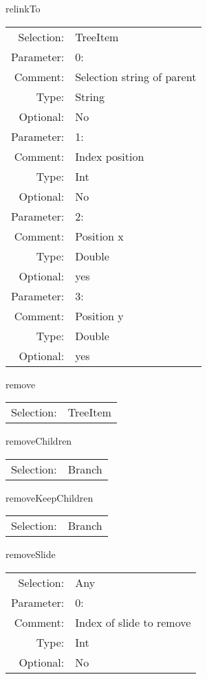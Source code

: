 \item relinkTo\\
\begin{tabular}{rl}
  Selection: & TreeItem\\
   Parameter: &  0:\\
        Comment: & Selection string of parent\\
           Type: & String\\
       Optional: &  No\\
   Parameter: &  1:\\
        Comment: & Index position\\
           Type: & Int\\
       Optional: &  No\\
   Parameter: &  2:\\
        Comment: & Position x\\
           Type: & Double\\
       Optional: &  yes\\
   Parameter: &  3:\\
        Comment: & Position y\\
           Type: & Double\\
       Optional: &  yes\\
\end{tabular}

\item remove\\
\begin{tabular}{rl}
  Selection: & TreeItem\\
\end{tabular}

\item removeChildren\\
\begin{tabular}{rl}
  Selection: & Branch\\
\end{tabular}

\item removeKeepChildren\\
\begin{tabular}{rl}
  Selection: & Branch\\
\end{tabular}

\item removeSlide\\
\begin{tabular}{rl}
  Selection: & Any\\
   Parameter: &  0:\\
        Comment: & Index of slide to remove\\
           Type: & Int\\
       Optional: &  No\\
\end{tabular}


